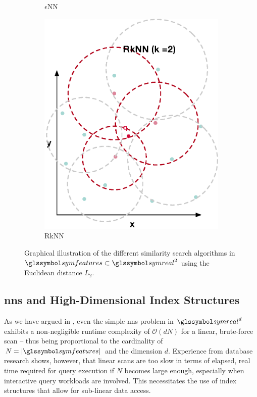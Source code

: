 \begin{figure}
\begin{subfigure}[b]{0.25\textwidth}
        \caption{$\epsilon$NN}
        \label{fig:enn}
    \end{subfigure}
    \hfill
    \begin{subfigure}[b]{0.25\textwidth}
        \centering
        \includegraphics[width=\textwidth]{figures/rknn}
        \caption{RkNN}
        \label{fig:rknn}
    \end{subfigure}
    \caption{Graphical illustration of the different similarity search algorithms in $\symfeatures \subset \symreal^2$ using the Euclidean distance $L_2$.}
    \label{fig:sim_search_algorithm}
\end{figure}

\subsection{\acrshort{nns} and High-Dimensional Index Structures}

As we have argued in , even the simple \acrshort{nns} problem in $\symreal^d$ exhibits a non-negligible runtime complexity of $\mathcal{O}(dN)$ for a linear, brute-force scan -- thus being proportional to the cardinality of $N = |\symfeatures|$ and the dimension $d$. Experience from database research shows, however, that linear scans are too slow in terms of elapsed, real time required for query execution if $N$ becomes large enough, especially when interactive query workloads are involved. This necessitates the use of index structures that allow for sub-linear data access.

